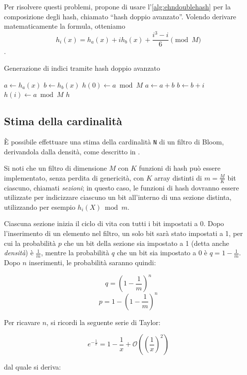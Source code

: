 Per risolvere questi problemi, \cite{bloom-doublehash} propone di usare
l'\autoref{alg:ehndoublehash} per la composizione degli hash, chiamato  ``hash doppio
avanzato''. Volendo derivare matematicamente la formula, otteniamo $$ h_i(x) = h_a(x) + ih_b(x) +
\frac{i^3-i}{6} \pmod M $$.

\begin{algorithm}
\caption{Generazione di indici tramite hash doppio avanzato}
\label{alg:ehndoublehash}
\begin{algorithmic}[1]
	\State $a \gets h_a(x)$
	\State $b \gets h_b(x)$
	\State $h(0) \gets a \bmod M$
		\State $a \gets a+b$
		\State $b \gets b+i$
		\State $h(i) \gets a \bmod M$
	\EndFor
	\State \Return $h$
\EndProcedure
\end{algorithmic}
\end{algorithm}

\subsection{Stima della cardinalità}
\label{sec:bloomcard}

È possibile effettuare una stima della cardinalità \verb|N| di un filtro di Bloom, derivandola
dalla densità, come descritto in \cite{bloom-scalable}.

Si noti che un filtro di dimensione $M$ con $K$ funzioni di hash può essere implementato, senza
perdita di genericità, con $K$ array distinti di $m=\frac{M}{K}$ bit ciascuno, chiamati
\emph{sezioni}; in questo caso, le funzioni di hash dovranno essere utilizzate per indicizzare
ciascuno un bit all'interno di una sezione distinta, utilizzando per esempio $h_i(X) \bmod m$.

Ciascuna sezione inizia il ciclo di vita con tutti i bit impostati a 0. Dopo l'inserimento di un
elemento nel filtro, un solo bit sarà stato impostati a 1, per cui la probabilità $p$ che un bit
della sezione sia impostato a 1 (detta anche \emph{densità}) è $\frac{1}{m}$, mentre la probabilità
$q$ che un bit sia impostato a 0 è $ q=1-\frac{1}{m}$. Dopo $n$ inserimenti, le probabilità saranno
quindi: 

$$ q = (1-\frac{1}{m})^n $$
$$ p = 1-(1-\frac{1}{m})^n $$

Per ricavare $n$, si ricordi la seguente serie di Taylor:

$$ e^{-\frac{1}{x}} = 1 - \frac{1}{x} + \mathcal{O}((\frac{1}{x})^2) $$

dal quale si deriva:


